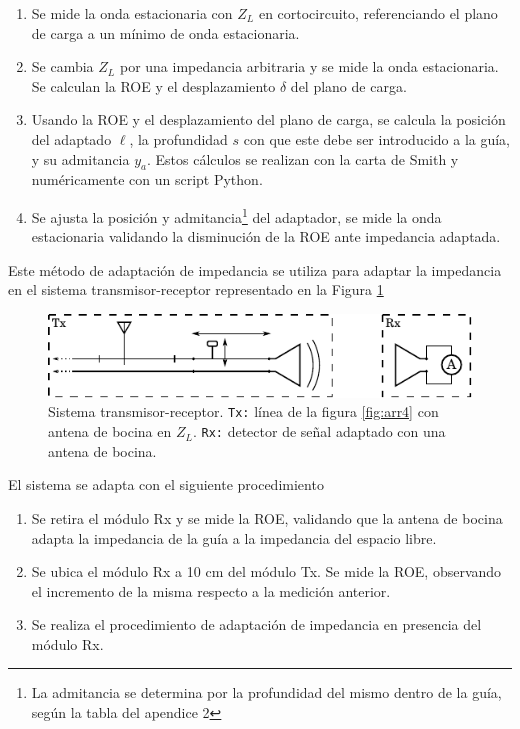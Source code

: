 \documentclass[11pt,a4paper]{article}
\begin{document}
\begin{multicols}{2}
\begin{enumerate}
    \item Se mide la onda estacionaria con $Z_L$ en cortocircuito, referenciando el plano de carga a un mínimo de onda estacionaria.
    \item Se cambia $Z_L$ por una impedancia arbitraria y se mide la onda estacionaria. Se calculan la ROE y el desplazamiento $\delta$ del plano de carga.
    \item Usando la ROE y el desplazamiento del plano de carga, se calcula la posición del adaptado $\ell$, la profundidad $s$ con que este debe ser introducido a la guía, y su admitancia $y_a$. 
    Estos cálculos se realizan con la carta de Smith y numéricamente con un script Python.
    \item Se ajusta la posición y admitancia\footnote{La admitancia se determina por la profundidad del mismo dentro de la guía, según la tabla del apendice 2} del adaptador, se mide la onda estacionaria validando la disminución de la ROE ante impedancia adaptada.
\end{enumerate}

Este método de adaptación de impedancia se utiliza para adaptar la impedancia en el sistema transmisor-receptor representado en la Figura \ref{fig:sistema}

\begin{figure}[H]
    \centering
    \includegraphics[width=\linewidth]{Images/sistema.pdf}
    \caption{Sistema transmisor-receptor.
    \texttt{Tx:} línea de la figura \ref{fig:arr4} con antena de bocina en $Z_L$. 
    \texttt{Rx:} detector de señal adaptado con una antena de bocina.}
    \label{fig:sistema}
\end{figure}

El sistema se adapta con el siguiente procedimiento
\begin{enumerate}
    \item Se retira el módulo Rx y se mide la ROE, validando que la antena de bocina adapta la impedancia de la guía a la impedancia del espacio libre.
    \item Se ubica el módulo Rx a 10 cm del módulo Tx. Se mide la ROE, observando el incremento de la misma respecto a la medición anterior.
    \item Se realiza el procedimiento de adaptación de impedancia en presencia del módulo Rx.
\end{enumerate}


\end{multicols}
\end{document}

